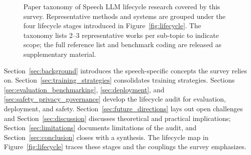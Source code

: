 \begin{figure}[t]
\caption{Paper taxonomy of Speech LLM lifecycle research covered by
this survey. Representative methods and systems are grouped under the
four lifecycle stages introduced in
Figure~\ref{fig:lifecycle}. The taxonomy lists 2--3 representative
works per sub-topic to indicate scope; the full reference list and
benchmark coding are released as supplementary material.}
\label{fig:taxonomy}
\end{figure}


Section~\ref{sec:background} introduces the speech-specific concepts
the survey relies on. Section~\ref{sec:training_strategies}
consolidates training strategies. Sections
\ref{sec:evaluation_benchmarking}, \ref{sec:deployment}, and
\ref{sec:safety_privacy_governance} develop the lifecycle audit for
evaluation, deployment, and safety.
Section~\ref{sec:future_directions} lays out open challenges and
Section~\ref{sec:discussion} discusses theoretical and practical
implications; Section~\ref{sec:limitations} documents limitations of
the audit, and Section~\ref{sec:conclusion} closes with a synthesis.
The lifecycle map in Figure~\ref{fig:lifecycle} traces these stages
and the couplings the survey emphasizes.

